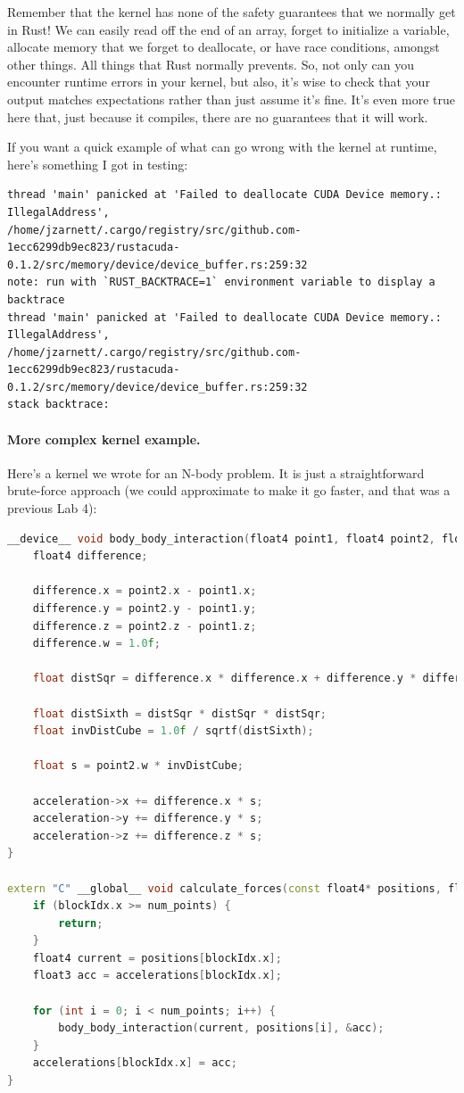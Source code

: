 \documentclass[a4paper]{report}
\begin{document}
Remember that the kernel has none of the safety guarantees that we normally get in Rust! We can easily read off the end of an array, forget to initialize a variable, allocate memory that we forget to deallocate, or have race conditions, amongst other things. All things that Rust normally prevents. So, not only can you encounter runtime errors in your kernel, but also, it's wise to check that your output matches expectations rather than just assume it's fine. It's even more true here that, just because it compiles, there are no guarantees that it will work.

If you want a quick example of what can go wrong with the kernel at runtime, here's something I got in testing:
{\scriptsize
\begin{verbatim}
thread 'main' panicked at 'Failed to deallocate CUDA Device memory.: IllegalAddress', 
/home/jzarnett/.cargo/registry/src/github.com-1ecc6299db9ec823/rustacuda-0.1.2/src/memory/device/device_buffer.rs:259:32
note: run with `RUST_BACKTRACE=1` environment variable to display a backtrace
thread 'main' panicked at 'Failed to deallocate CUDA Device memory.: IllegalAddress', 
/home/jzarnett/.cargo/registry/src/github.com-1ecc6299db9ec823/rustacuda-0.1.2/src/memory/device/device_buffer.rs:259:32
stack backtrace:
\end{verbatim}
}

\paragraph{More complex kernel example.} Here's a kernel we wrote for an N-body problem. It is just a straightforward brute-force approach (we could approximate to make it go faster, and that was a previous Lab 4):

\begin{lstlisting}[language=C++]
__device__ void body_body_interaction(float4 point1, float4 point2, float3 *acceleration) {
    float4 difference;

    difference.x = point2.x - point1.x;
    difference.y = point2.y - point1.y;
    difference.z = point2.z - point1.z;
    difference.w = 1.0f;

    float distSqr = difference.x * difference.x + difference.y * difference.y + difference.z * difference.z + 1e-10;

    float distSixth = distSqr * distSqr * distSqr;
    float invDistCube = 1.0f / sqrtf(distSixth);

    float s = point2.w * invDistCube;

    acceleration->x += difference.x * s;
    acceleration->y += difference.y * s;
    acceleration->z += difference.z * s;
}

extern "C" __global__ void calculate_forces(const float4* positions, float3* accelerations, int num_points) {
    if (blockIdx.x >= num_points) {
        return;
    }
    float4 current = positions[blockIdx.x];
    float3 acc = accelerations[blockIdx.x];

    for (int i = 0; i < num_points; i++) {
        body_body_interaction(current, positions[i], &acc);
    }
    accelerations[blockIdx.x] = acc;
}
\end{lstlisting}
\end{document}
